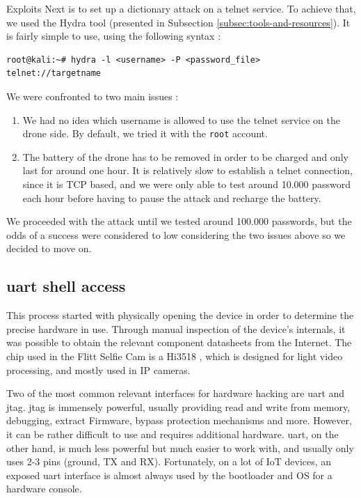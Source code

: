 \begin{chaptercover}{Exploits}
Next is to set up a dictionary attack on a telnet service. To achieve that, we used the Hydra tool (presented in Subsection \ref{subsec:tools-and-resources}). It is fairly simple to use, using the following syntax :

\begin{center}
\begin{minipage}{.95\linewidth}
\begin{lstlisting}
root@kali:~# hydra -l <username> -P <password_file> telnet://targetname
\end{lstlisting}
\end{minipage}
\end{center}

We were confronted to two main issues :
\begin{enumerate}
  \item We had no idea which username is allowed to use the telnet service on the drone side. By default, we tried it with the \texttt{root} account.
  \item The battery of the drone has to be removed in order to be charged and only last for around one hour. It is relatively slow to establish a telnet connection, since it is TCP based, and we were only able to test around 10.000 password each hour before having to pause the attack and recharge the battery.
\end{enumerate}

We proceeded with the attack until we tested around 100.000 passwords, but the odds of a success were considered to low considering the two issues above so we decided to move on.

\subsection{\acrshort{uart} shell access}

This process started with physically opening the device in order to determine the precise hardware in use. Through manual inspection of the device’s internals, it was possible to obtain the relevant component datasheets from the Internet. The chip used in the Flitt Selfie Cam is a Hi3518 \cite{hi3518-datasheet}, which is designed for light video processing, and mostly used in IP cameras. 

Two of the most common relevant interfaces for hardware hacking are \acrfull{uart} and \acrfull{jtag}. \acrshort{jtag} is immensely powerful, usually providing read and write from memory, debugging, extract Firmware, bypass protection mechanisms and more. However, it can be rather difficult to use and requires additional hardware. \acrshort{uart}, on the other hand, is much less powerful but much easier to work with, and usually only uses 2-3 pins (ground, TX and RX). Fortunately, on a lot of IoT devices, an exposed \acrshort{uart} interface is almost always used by the bootloader and OS for a hardware console.


\end{chaptercover}
